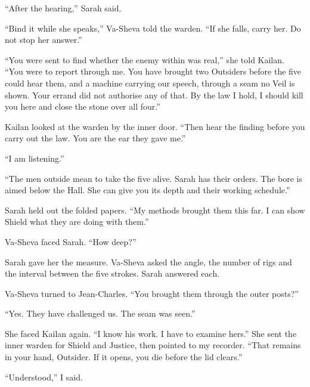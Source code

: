 ``After the hearing,'' Sarah said.\par

``Bind it while she speaks,'' Va-Sheva told the warden. ``If she falls, carry her. Do not stop her answer.''\par

``You were sent to find whether the enemy within was real,'' she told Kailan. ``You were to report through me. You have brought two Outsiders before the five could hear them, and a machine carrying our speech, through a seam no Veil is shown. Your errand did not authorise any of that. By the law I hold, I should kill you here and close the stone over all four.''\par

Kailan looked at the warden by the inner door. ``Then hear the finding before you carry out the law. You are the ear they gave me.''\par

``I am listening.''\par

``The men outside mean to take the five alive. Sarah has their orders. The bore is aimed below the Hall. She can give you its depth and their working schedule.''\par

Sarah held out the folded papers. ``My methods brought them this far. I can show Shield what they are doing with them.''\par

Va-Sheva faced Sarah. ``How deep?''\par

Sarah gave her the measure. Va-Sheva asked the angle, the number of rigs and the interval between the five strokes. Sarah answered each.\par

Va-Sheva turned to Jean-Charles. ``You brought them through the outer posts?''\par

``Yes. They have challenged us. The seam was seen.''\par

She faced Kailan again. ``I know his work. I have to examine hers.'' She sent the inner warden for Shield and Justice, then pointed to my recorder. ``That remains in your hand, Outsider. If it opens, you die before the lid clears.''\par

``Understood,'' I said.\par

